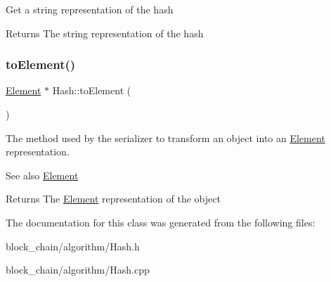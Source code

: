 Get a string representation of the hash

\begin{DoxyReturn}{Returns}
The string representation of the hash 
\end{DoxyReturn}
\mbox{\label{classHash_a35e01449aedb17a0172837c87986181e}} 
\subsubsection{\texorpdfstring{to\+Element()}{toElement()}}
{\footnotesize\ttfamily \mbox{\hyperlink{classElement}{Element}} $\ast$ Hash\+::to\+Element (\begin{DoxyParamCaption}{ }\end{DoxyParamCaption})}

The method used by the serializer to transform an object into an \mbox{\hyperlink{classElement}{Element}} representation. \begin{DoxySeeAlso}{See also}
\mbox{\hyperlink{classElement}{Element}}
\end{DoxySeeAlso}
\begin{DoxyReturn}{Returns}
The \mbox{\hyperlink{classElement}{Element}} representation of the object 
\end{DoxyReturn}


The documentation for this class was generated from the following files\+:\begin{DoxyCompactItemize}
\item 
block\+\_\+chain/algorithm/Hash.\+h\item 
block\+\_\+chain/algorithm/Hash.\+cpp\end{DoxyCompactItemize}
